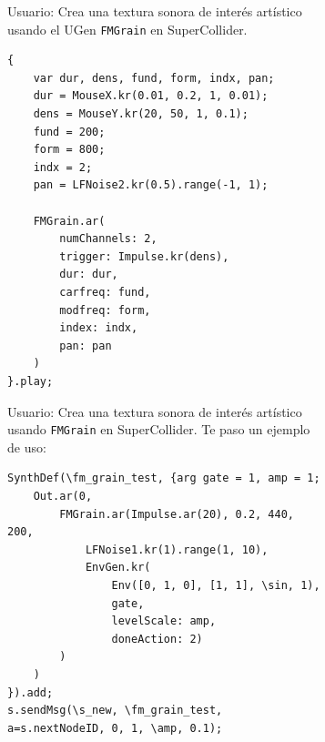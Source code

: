 \begin{figure}%
    \caption[Comparación de resultados de ChatGPT con  {zero-shot} y {few-shot}]{Comparación de resultados de ChatGPT con (\textbf{a}) {zero-shot} y (\textbf{b}) {few-shot}.}
    \centering
    \begin{subfigure}{.48\textwidth}
      \centering
      \begin{mdframed}
        \fontsize{9.5pt}{11pt}\selectfont
        Usuario: Crea una textura sonora de interés artístico usando el UGen \texttt{FMGrain} en SuperCollider.
      \end{mdframed}
      \begin{lstlisting}[style=SuperCollider-IDE, basicstyle=\footnotesize\ttfamily, numbers=none]
{
    var dur, dens, fund, form, indx, pan;
    dur = MouseX.kr(0.01, 0.2, 1, 0.01); 
    dens = MouseY.kr(20, 50, 1, 0.1);
    fund = 200;                     
    form = 800;
    indx = 2;
    pan = LFNoise2.kr(0.5).range(-1, 1); 

    FMGrain.ar(
        numChannels: 2,
        trigger: Impulse.kr(dens),
        dur: dur,
        carfreq: fund,
        modfreq: form,
        index: indx,
        pan: pan
    )
}.play;    
                \end{lstlisting}
    \end{subfigure}\hfill
    \begin{subfigure}{.48\textwidth}
      \centering
      \begin{mdframed}
        \fontsize{9.5pt}{11pt}\selectfont
        Usuario: Crea una textura sonora de interés artístico usando \texttt{FMGrain} en SuperCollider. Te paso un ejemplo de uso:
        \begin{lstlisting}[style=SuperCollider-IDE, basicstyle=\footnotesize\ttfamily, numbers=none]
SynthDef(\fm_grain_test, {arg gate = 1, amp = 1;
    Out.ar(0,
        FMGrain.ar(Impulse.ar(20), 0.2, 440, 200,
            LFNoise1.kr(1).range(1, 10),
            EnvGen.kr(
                Env([0, 1, 0], [1, 1], \sin, 1),
                gate,
                levelScale: amp,
                doneAction: 2)
        )
    )
}).add;
s.sendMsg(\s_new, \fm_grain_test, a=s.nextNodeID, 0, 1, \amp, 0.1);
        \end{lstlisting}
      \end{mdframed}


\end{subfigure}
\end{figure}
